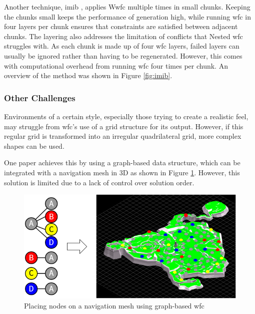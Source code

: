 Another technique, \acrlong{imib} \cite{Infinite_Modifying_In_Blocks}, applies W\acrshort{wfc} multiple times in small chunks. Keeping the chunks small keeps the performance of generation high, while running \acrshort{wfc} in four layers per chunk ensures that constraints are satisfied between adjacent chunks. The layering also addresses the limitation of conflicts that Nested \acrshort{wfc} struggles with. As each chunk is made up of four \acrshort{wfc} layers, failed layers can usually be ignored rather than having to be regenerated. However, this comes with computational overhead from running \acrshort{wfc} four times per chunk. An overview of the method was shown in Figure \ref{fig:imib}.

\subsubsection{Other Challenges}
Environments of a certain style, especially those trying to create a realistic feel, may struggle from \acrshort{wfc}'s use of a grid structure for its output. However, if this regular grid is transformed into an irregular quadrilateral grid, more complex shapes can be used.

One paper \cite{WFC_Graph-based} achieves this by using a graph-based data structure, which can be integrated with a navigation mesh in 3D as shown in Figure \ref{fig:navigationMeshNodePlacement}. However, this solution is limited due to a lack of control over solution order.

\begin{figure}[H]
    \centering
    \includegraphics[width=\textwidth, height=0.3\textheight, keepaspectratio]{Images/NavigationMeshNodePlacement.png}
    \caption{Placing nodes on a navigation mesh using graph-based \acrshort{wfc} \cite{WFC_Graph-based}}
    \label{fig:navigationMeshNodePlacement}
\end{figure}

